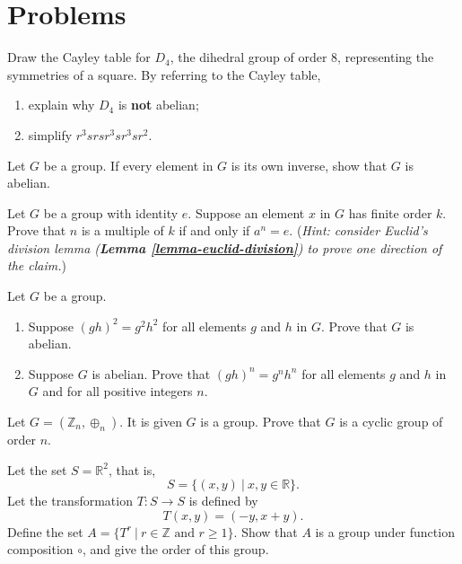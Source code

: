 \newpage

\section{Problems}
\begin{problem}
    Draw the Cayley table for $D_4$, the dihedral group of order 8, representing the symmetries of a square. By referring to the Cayley table,
    \begin{enumerate}[label=(\alph*)]
        \item explain why $D_4$ is \textbf{not} abelian;
        \item simplify $r^3srsr^3sr^3sr^2$.
    \end{enumerate}
\end{problem}

\begin{problem}
    Let $G$ be a group. If every element in $G$ is its own inverse, show that $G$ is abelian.
\end{problem}

\begin{problem}\label{problem-element-to-power-of-multiple-of-order-is-identity}
    Let $G$ be a group with identity $e$. Suppose an element $x$ in $G$ has finite order $k$. Prove that $n$ is a multiple of $k$ if and only if $a^n = e$.\newline
    (\textit{Hint: consider Euclid's division lemma (\textbf{Lemma \ref{lemma-euclid-division}}) to prove one direction of the claim.})
\end{problem}

\begin{problem}
    Let $G$ be a group.
    \begin{enumerate}[label=(\alph*)]
        \item Suppose $(gh)^2 = g^2h^2$ for all elements $g$ and $h$ in $G$. Prove that $G$ is abelian.
        \item Suppose $G$ is abelian. Prove that $(gh)^n = g^nh^n$ for all elements $g$ and $h$ in $G$ and for all positive integers $n$.
    \end{enumerate}
\end{problem}

\begin{problem}
    Let $G = (\mathbb{Z}_n, \oplus_n)$. It is given $G$ is a group. Prove that $G$ is a cyclic group of order $n$.
\end{problem}

\newpage

\begin{problem}
    Let the set $S = \mathbb{R}^2$, that is,
    \[
        S = \{(x, y) \ | \ x, y \in \mathbb{R}\}.
    \]
    Let the transformation $T: S \to S$ is defined by
    \[
        T(x, y) = (-y, x+y).
    \]
    Define the set $A = \{T^r \ | \ r \in \mathbb{Z} \text{ and } r \geq 1\}$. Show that $A$ is a group under function composition $\circ$, and give the order of this group.
\end{problem}

